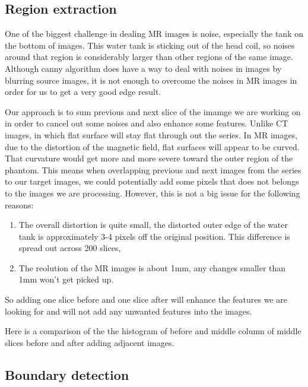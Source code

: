 \subsection{Region extraction}

One of the biggest challenge in dealing MR images is noise, especially the tank on the bottom of images. 
This water tank is sticking out of the head coil, so noises around that region is considerably larger than
other regions of the same image. Although canny algorithm does have a way to deal with noises in images by 
blurring source images, it is not enough to overcome the noises in MR images in order for us to get a very
good edge result.

Our approach is to sum previous and next slice of the imamge we are working on in order to cancel out some
noises and also enhance some features. Unlike CT images, in which flat surface will stay flat through out the
series. In MR images, due to the distortion of the magnetic field, flat surfaces will appear to be curved.
That curvature would get more and more severe toward the outer region of the phantom. This means when
overlapping previous and next images from the series to our target images, we could potentially add some 
pixels that does not belongs to the images we are processing. However, this is not a big issue for the
following reasons:

\begin{enumerate}
\item The overall distortion is quite small, the distorted outer edge of the water tank is approximately 
  3-4 pixels off the original position. This difference is spread out across 200 slices,
\item The reolution of the MR images is about 1mm, any changes smaller than 1mm won't get picked up. 
\end{enumerate}

So adding one slice before and one slice after will enhance the features we are looking for and will not 
add any unwanted features into the images.

Here is a comparison of the the histogram of before and middle column of middle slices before and after 
adding adjacent images.


\subsection{Boundary detection}

